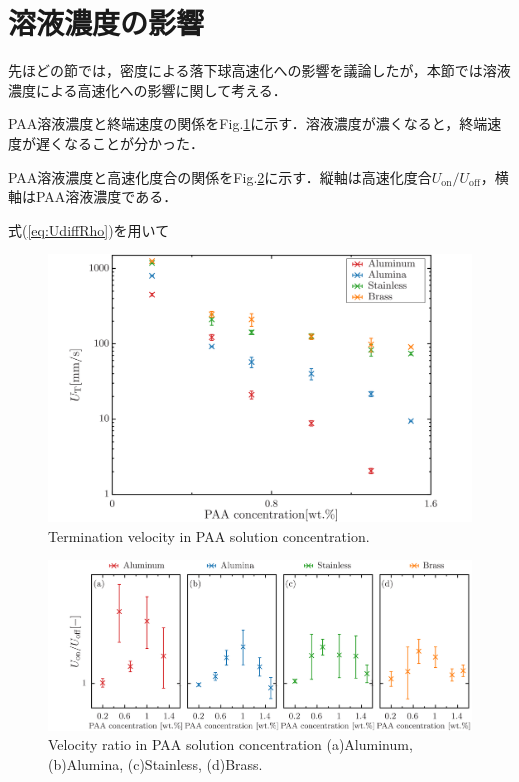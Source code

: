 \section{溶液濃度の影響}

先ほどの節では，密度による落下球高速化への影響を議論したが，本節では溶液濃度による高速化への影響に関して考える．

PAA溶液濃度と終端速度の関係をFig.\ref{fig:concentrationUT}に示す．溶液濃度が濃くなると，終端速度が遅くなることが分かった．

PAA溶液濃度と高速化度合の関係をFig.\ref{fig:concentrationUdiff}に示す．縦軸は高速化度合$U_\text{on}/U_\text{off}$，横軸はPAA溶液濃度である．

式(\ref{eq:UdiffRho})を用いて

\begin{figure}[ht]
    \centering
    \includegraphics[width=1.0\textwidth]{./5-Results/concentration/concentrationUT.png}
    \caption{Termination velocity in PAA solution concentration.}
    \label{fig:concentrationUT}
\end{figure}

\begin{figure}[ht]
    \centering
    \includegraphics[width=1.0\textwidth]{./5-Results/concentration/concentrationUdiff.png}
    \caption{Velocity ratio in PAA solution concentration (a)Aluminum, (b)Alumina, (c)Stainless, (d)Brass.}
    \label{fig:concentrationUdiff}
\end{figure}

